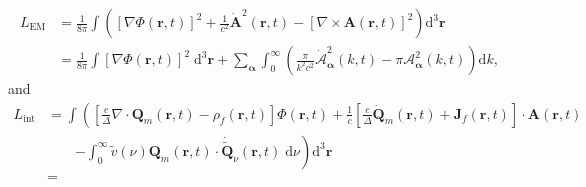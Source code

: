\documentclass{article}
\begin{document}
\begin{equation}
\begin{split}
L_\mathrm{EM} &= \frac{1}{8\pi}\int\left(\left[\nabla\Phi(\mathbf{r},t)\right]^2 + \frac{1}{c^2}\dot{\mathbf{A}}^2(\mathbf{r},t) - \left[\nabla\times\mathbf{A}(\mathbf{r},t)\right]^2\right)\mathrm{d}^3\mathbf{r}\\
&= \frac{1}{8\pi}\int\left[\nabla\Phi(\mathbf{r},t)\right]^2\;\mathrm{d}^3\mathbf{r} + \sum_{\bm{\alpha}}\int_0^\infty\left(\frac{\pi}{k^2c^2}\dot{\mathcal{A}}^2_{\bm{\alpha}}(k,t) - \pi\mathcal{A}_{\bm{\alpha}}^2(k,t)\right)\mathrm{d}k,
\end{split}
\end{equation}
and
\begin{equation}
\begin{split}
L_\mathrm{int} &= \int\left(\left[\frac{e}{\Delta}\nabla\cdot\mathbf{Q}_m(\mathbf{r},t) - \rho_f(\mathbf{r},t)\right]\Phi(\mathbf{r},t) + \frac{1}{c}\left[\frac{e}{\Delta}\dot{\mathbf{Q}}_m(\mathbf{r},t) + \mathbf{J}_f(\mathbf{r},t)\right]\cdot\mathbf{A}(\mathbf{r},t)\right.\\
&\qquad\left. - \int_0^\infty\tilde{v}(\nu)\mathbf{Q}_m(\mathbf{r},t)\cdot\dot{\tilde{\mathbf{Q}}}_\nu(\mathbf{r},t)\;\mathrm{d}\nu\right)\mathrm{d}^3\mathbf{r}\\
&= 
\end{split}
\end{equation}
\end{document}
